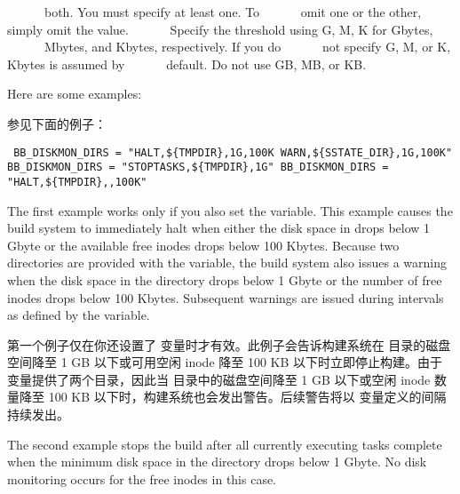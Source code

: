 {\begin{codeblock}
{${}$\ \ \ \ \ \ both.  You must specify at least one.  To \linebreak
${}$\ \ \ \ \ \ omit one or the other, simply omit the value. \linebreak
${}$\ \ \ \ \ \ Specify the threshold using G, M, K for Gbytes, \linebreak
${}$\ \ \ \ \ \ Mbytes, and Kbytes, respectively. If you do \linebreak
${}$\ \ \ \ \ \ not specify G, M, or K, Kbytes is assumed by \linebreak
${}$\ \ \ \ \ \ default.  Do not use GB, MB, or KB.
}
\end{codeblock}

\medskip
Here are some examples:

\medskip
参见下面的例子：

\medskip
\begin{codeblock}
\footnotesize
\texttt{\noindent
BB\_DISKMON\_DIRS = "HALT,\$\{TMPDIR\},1G,100K WARN,\$\{SSTATE\_DIR\},1G,100K" \linebreak
BB\_DISKMON\_DIRS = "STOPTASKS,\$\{TMPDIR\},1G" \linebreak
BB\_DISKMON\_DIRS = "HALT,\$\{TMPDIR\},,100K"
}
\end{codeblock}

\medskip
The first example works only if you also set the  variable. This example causes the build system to immediately halt when either the disk space in  drops below 1 Gbyte or the available free inodes drops below 100 Kbytes. Because two directories are provided with the variable, the build system also issues a warning when the disk space in the  directory drops below 1 Gbyte or the number of free inodes drops below 100 Kbytes. Subsequent warnings are issued during intervals as defined by the  variable.

\medskip
第一个例子仅在你还设置了  变量时才有效。此例子会告诉构建系统在  目录的磁盘空间降至 1 GB 以下或可用空闲 inode 降至 100 KB 以下时立即停止构建。由于变量提供了两个目录，因此当  目录中的磁盘空间降至 1 GB 以下或空闲 inode 数量降至 100 KB 以下时，构建系统也会发出警告。后续警告将以 变量定义的间隔持续发出。

\medskip
The second example stops the build after all currently executing tasks complete when the minimum disk space in the  directory drops below 1 Gbyte. No disk monitoring occurs for the free inodes in this case.

}
